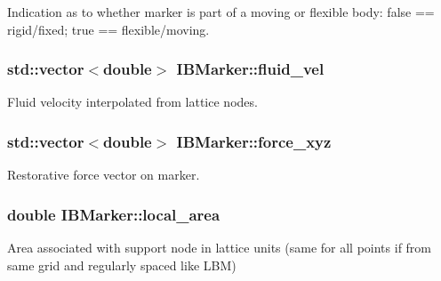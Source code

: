 Indication as to whether marker is part of a moving or flexible body\+: false == rigid/fixed; true == flexible/moving. 

\subsubsection[{\texorpdfstring{fluid\+\_\+vel}{fluid_vel}}]{\setlength{\rightskip}{0pt plus 5cm}std\+::vector$<$double$>$ I\+B\+Marker\+::fluid\+\_\+vel\hspace{0.3cm}{\ttfamily [protected]}}\hypertarget{class_i_b_marker_aa31ccf45de61bfccc60876ac9e98909a}{}\label{class_i_b_marker_aa31ccf45de61bfccc60876ac9e98909a}


Fluid velocity interpolated from lattice nodes. 

\subsubsection[{\texorpdfstring{force\+\_\+xyz}{force_xyz}}]{\setlength{\rightskip}{0pt plus 5cm}std\+::vector$<$double$>$ I\+B\+Marker\+::force\+\_\+xyz\hspace{0.3cm}{\ttfamily [protected]}}\hypertarget{class_i_b_marker_aa8b8b23e64a8bfc4051b95ebf9ccb767}{}\label{class_i_b_marker_aa8b8b23e64a8bfc4051b95ebf9ccb767}


Restorative force vector on marker. 

\subsubsection[{\texorpdfstring{local\+\_\+area}{local_area}}]{\setlength{\rightskip}{0pt plus 5cm}double I\+B\+Marker\+::local\+\_\+area\hspace{0.3cm}{\ttfamily [protected]}}\hypertarget{class_i_b_marker_aa332dcba1676eae4fbb6d0fa6caca809}{}\label{class_i_b_marker_aa332dcba1676eae4fbb6d0fa6caca809}


Area associated with support node in lattice units (same for all points if from same grid and regularly spaced like L\+BM) 

